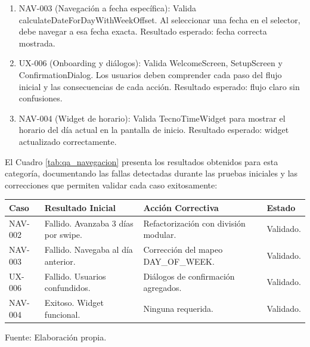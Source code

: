 \begin{enumerate}
\begin{enumerate}[label=\alph*)]
    \item NAV-003 (Navegación a fecha específica): Valida calculateDateForDayWithWeekOffset. Al seleccionar una fecha en el selector, debe navegar a esa fecha exacta. Resultado esperado: fecha correcta mostrada.
    
    \item UX-006 (Onboarding y diálogos): Valida WelcomeScreen, SetupScreen y ConfirmationDialog. Los usuarios deben comprender cada paso del flujo inicial y las consecuencias de cada acción. Resultado esperado: flujo claro sin confusiones.
    
    \item NAV-004 (Widget de horario): Valida TecnoTimeWidget para mostrar el horario del día actual en la pantalla de inicio. Resultado esperado: widget actualizado correctamente.
  \end{enumerate}
  
  El Cuadro \ref{tab:qa_navegacion} presenta los resultados obtenidos para esta categoría, documentando las fallas detectadas durante las pruebas iniciales y las correcciones que permiten validar cada caso exitosamente:
  
  \begin{center}
  \begin{minipage}{\linewidth}
  \centering
  \begin{tabularx}{\linewidth}{@{}>{\RaggedRight\arraybackslash}p{2.0cm}>{\RaggedRight\arraybackslash}X>{\RaggedRight\arraybackslash}X>{\RaggedRight\arraybackslash}p{1.8cm}@{}}
  \toprule
  Caso & Resultado Inicial & Acción Correctiva & Estado \\
  \midrule
  NAV-002 & Fallido. Avanzaba 3 días por swipe. & Refactorización con división modular. & Validado. \\
  \addlinespace
  NAV-003 & Fallido. Navegaba al día anterior. & Corrección del mapeo DAY\_OF\_WEEK. & Validado. \\
  \addlinespace
  UX-006 & Fallido. Usuarios confundidos. & Diálogos de confirmación agregados. & Validado. \\
  \addlinespace
  NAV-004 & Exitoso. Widget funcional. & Ninguna requerida. & Validado. \\
  \bottomrule
  \end{tabularx}
  \label{tab:qa_navegacion}
  Fuente: Elaboración propia.
  \end{minipage}
  \end{center}
  

\end{enumerate}
